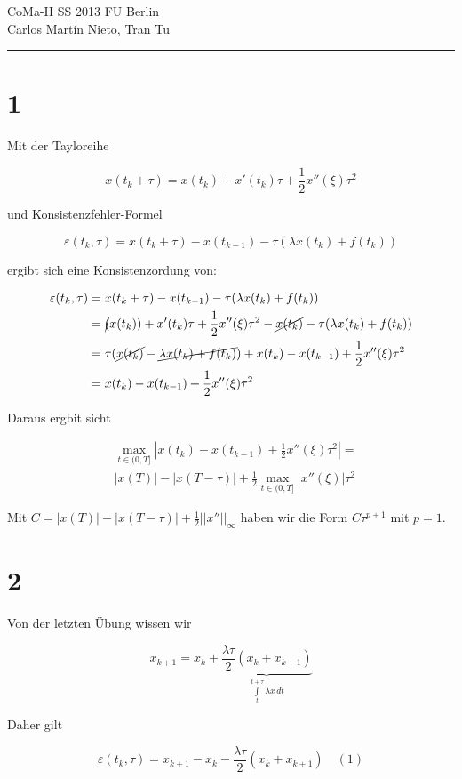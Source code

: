 \documentclass[ngerman,a4paper]{scrartcl}
\newcommand{\norm}[1]{\left|\!\left|#1\right|\! \right|}
\begin{document}
{\sffamily
  \hfill
  CoMa-II SS 2013\hfill
  FU Berlin\\[8pt]
  \hfill Carlos Martín Nieto, Tran Tu\hrule \bigskip
}

\section*{1}

Mit der Tayloreihe

\[
x(t_k + \tau) = x(t_k) + x'(t_k)\tau + \frac{1}{2} x''(\xi) \tau^2
\]

und Konsistenzfehler-Formel

\[
\varepsilon(t_k,\tau) = x(t_k + \tau) - x(t_{k-1}) - \tau(\lambda x(t_k) + f(t_k))
\]

ergibt sich eine Konsistenzordung von:

\begin{align*}
\varepsilon(t_k,\tau) &= x(t_k + \tau) - x(t_{k-1}) - \tau(\lambda x(t_k) + f(t_k))\\
&= \cancel(x(t_k)) + x'(t_k)\tau + \frac{1}{2}x''(\xi)\tau^2 - \cancel{x(t_k)} -\tau(\lambda x(t_k) + f(t_k))\\
&= \tau(\cancel{x(t_k)} - \cancel{\lambda x(t_k) + f(t_k)}) + x(t_k) - x(t_{k-1}) + \frac{1}{2}x''(\xi)\tau^2\\
&=  x(t_k) - x(t_{k-1}) + \frac{1}{2}x''(\xi)\tau^2
\end{align*}

Daraus ergbit sicht

\begin{align*}
   &\max_{t\in (0, T]} |x(t_k) - x(t_{k-1}) + \frac{1}{2}x''(\xi)\tau^2| = \\
   &  |x(T)| - |x(T-\tau)| + \frac{1}{2}\max_{t\in (0, T]} |x''(\xi)|\tau^2
\end{align*}

Mit $C = |x(T)| - |x(T-\tau)| + \frac{1}{2}\norm{x''}_\infty$ haben
wir die Form $C\tau^{p+1}$ mit $p=1$.

\section*{2}

Von der letzten Übung wissen wir

\[
x_{k+1} = x_k + \underbrace{\frac{\lambda \tau}{2} (x_k + x_{k+1})}_{\int\limits^{t+\tau}_t \lambda x \, dt}
\]

Daher gilt

\[
\varepsilon(t_k, \tau) = x_{k+1} - x_k - \frac{\lambda\tau}{2} (x_k + x_{k+1}) \quad (1)
\]
\end{document}
